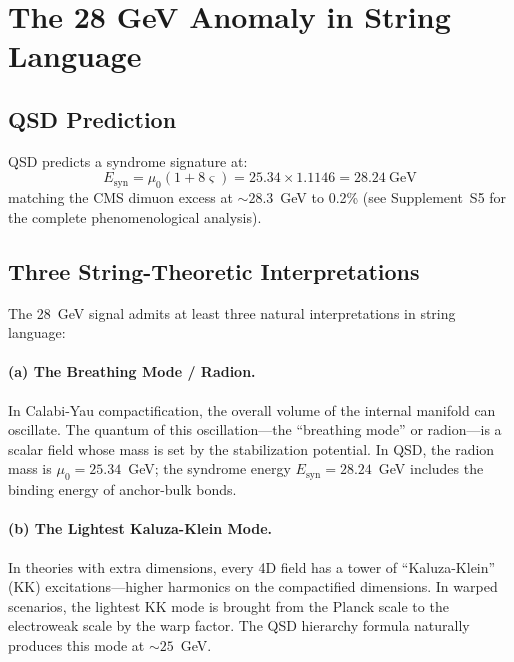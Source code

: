 \documentclass[11pt,a4paper]{article}
\theoremstyle{definition}
\newcommand{\strain}{\varsigma}            %
\newcommand{\murad}{\mu_0}
\newcommand{\Esyn}{E_{\mathrm{syn}}}
\begin{document}
\section{The 28 GeV Anomaly in String Language}
\label{sec:anomaly}

\subsection{QSD Prediction}

QSD predicts a syndrome signature at:
\begin{equation}
\Esyn = \murad(1 + 8\strain) = 25.34 \times 1.1146 = 28.24~\text{GeV}
\end{equation}
matching the CMS dimuon excess at $\sim28.3$~GeV to 0.2\% (see
Supplement~S5 for the complete phenomenological analysis).

\subsection{Three String-Theoretic Interpretations}

The 28~GeV signal admits at least three natural interpretations in string
language:

\paragraph{(a) The Breathing Mode / Radion.}
In Calabi-Yau compactification, the overall volume of the internal
manifold can oscillate.  The quantum of this oscillation---the
``breathing mode'' or radion---is a scalar field whose mass is set by the
stabilization potential.  In QSD, the radion mass is
$\murad = 25.34$~GeV; the syndrome energy $\Esyn = 28.24$~GeV includes
the binding energy of anchor-bulk bonds.

\paragraph{(b) The Lightest Kaluza-Klein Mode.}
In theories with extra dimensions, every 4D field has a tower of
``Kaluza-Klein'' (KK) excitations---higher harmonics on the compactified
dimensions.  In warped scenarios, the lightest KK mode is brought from
the Planck scale to the electroweak scale by the warp factor.  The QSD
hierarchy formula naturally produces this mode at $\sim 25$~GeV.
\end{document}

